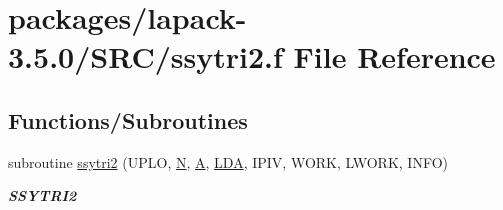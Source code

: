 \hypertarget{ssytri2_8f}{}\section{packages/lapack-\/3.5.0/\+S\+R\+C/ssytri2.f File Reference}
\label{ssytri2_8f}
\subsection*{Functions/\+Subroutines}
\begin{DoxyCompactItemize}
\item 
subroutine \hyperlink{group__realSYcomputational_ga7852066f959159f9701c0f63f90c5230}{ssytri2} (U\+P\+L\+O, \hyperlink{polmisc_8c_a0240ac851181b84ac374872dc5434ee4}{N}, \hyperlink{classA}{A}, \hyperlink{example__user_8c_ae946da542ce0db94dced19b2ecefd1aa}{L\+D\+A}, I\+P\+I\+V, W\+O\+R\+K, L\+W\+O\+R\+K, I\+N\+F\+O)
\begin{DoxyCompactList}\small\item\em {\bfseries S\+S\+Y\+T\+R\+I2} \end{DoxyCompactList}\end{DoxyCompactItemize}
